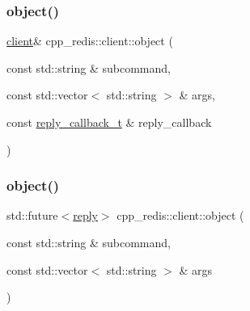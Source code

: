 \mbox{\label{classcpp__redis_1_1client_a950c545c23746a852476ec6939d6f6a5}} 
\subsubsection{\texorpdfstring{object()}{object()}\hspace{0.1cm}{\footnotesize\ttfamily [1/2]}}
{\footnotesize\ttfamily \hyperlink{classcpp__redis_1_1client}{client}\& cpp\+\_\+redis\+::client\+::object (\begin{DoxyParamCaption}\item[{const std\+::string \&}]{subcommand,  }\item[{const std\+::vector$<$ std\+::string $>$ \&}]{args,  }\item[{const \hyperlink{classcpp__redis_1_1client_a061a1140d36d2eaeda82b09a0bb3f9f2}{reply\+\_\+callback\+\_\+t} \&}]{reply\+\_\+callback }\end{DoxyParamCaption})}

\mbox{\label{classcpp__redis_1_1client_a6f6c1e715660f270030fd16d7d2d08bd}} 
\subsubsection{\texorpdfstring{object()}{object()}\hspace{0.1cm}{\footnotesize\ttfamily [2/2]}}
{\footnotesize\ttfamily std\+::future$<$\hyperlink{classcpp__redis_1_1reply}{reply}$>$ cpp\+\_\+redis\+::client\+::object (\begin{DoxyParamCaption}\item[{const std\+::string \&}]{subcommand,  }\item[{const std\+::vector$<$ std\+::string $>$ \&}]{args }\end{DoxyParamCaption})}

\mbox{\label{classcpp__redis_1_1client_afdab99b1752e759ab3ce9477f2cb092d}} 
